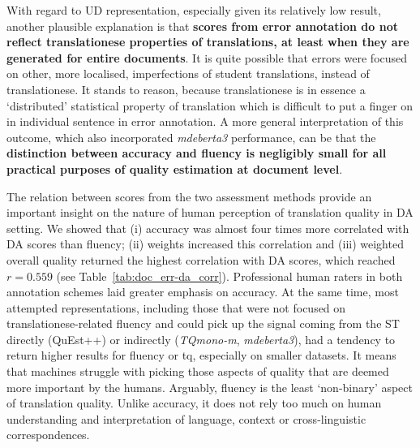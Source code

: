 With regard to UD representation, especially given its relatively low result, another plausible explanation is that \textbf{scores from error annotation do not reflect translationese properties of translations, at least when they are generated for entire documents}. It is quite possible that errors were focused on other, more localised, imperfections of student translations, instead of translationese. It stands to reason, because translationese is in essence a `distributed' statistical property of translation which is difficult to put a finger on in individual sentence in error annotation.
A more general interpretation of this outcome, which also incorporated \textit{mdeberta3} performance, can be that the \textbf{distinction between accuracy and fluency is negligibly small for all practical purposes of quality estimation at document level}.

The relation between scores from the two assessment methods provide an important insight on the nature of human perception of translation quality in DA setting. We showed that (i) accuracy was almost four times more correlated with DA scores than fluency; (ii) weights increased this correlation and (iii) weighted overall quality returned the highest correlation with DA scores, which reached $r=0.559$ (see Table~\ref{tab:doc_err-da_corr}). Professional human raters in both annotation schemes laid greater emphasis on accuracy. 
At the same time, most attempted representations, including those that were not focused on translationese-related fluency and could pick up the signal coming from the ST directly (QuEst++) or indirectly (\textit{TQmono-m}, \textit{mdeberta3}), had a tendency to return higher results for fluency or tq, especially on smaller datasets. It means that machines struggle with picking those aspects of quality that are deemed more important by the humans. Arguably, fluency is the least `non-binary' aspect of translation quality. Unlike accuracy, it does not rely too much on human understanding and interpretation of language, context or cross-linguistic correspondences. 

